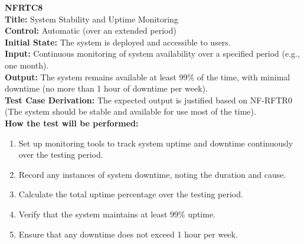 \documentclass[12pt, titlepage]{article}
\begin{document}
\textbf{NFRTC8}\\
\textbf{Title:} System Stability and Uptime Monitoring\\
\textbf{Control:} Automatic (over an extended period)\\
\textbf{Initial State:} The system is deployed and accessible to users.\\
\textbf{Input:} Continuous monitoring of system availability over a specified period (e.g., one month).\\
\textbf{Output:} The system remains available at least 99\% of the time, with minimal downtime (no more than 1 hour of downtime per week).\\
\textbf{Test Case Derivation:} The expected output is justified based on NF-RFTR0 (The system should be stable and available for use most of the time).\\
\textbf{How the test will be performed:}
\begin{enumerate}
  \item Set up monitoring tools to track system uptime and downtime continuously over the testing period.
  \item Record any instances of system downtime, noting the duration and cause.
  \item Calculate the total uptime percentage over the testing period.
  \item Verify that the system maintains at least 99\% uptime.
  \item Ensure that any downtime does not exceed 1 hour per week.
\end{enumerate}
\vspace{1em}
\end{document}
